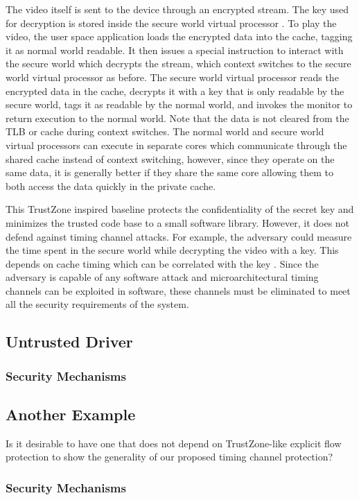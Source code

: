    The video itself is sent to the device through an encrypted stream. The key 
    used for decryption is stored inside the secure world virtual processor .  
    To play the video, the user space application loads the encrypted data into 
    the cache, tagging it as normal world readable. It then issues a special 
    instruction to interact with the secure world which decrypts the stream, 
    which context switches to the secure world virtual processor as before. The 
    secure world virtual processor
    reads the encrypted data in the cache, decrypts it with a key that is only 
    readable by the secure world, tags it as readable by the normal world, and 
    invokes the monitor to return execution to the normal world. Note that the 
    data is not cleared from the TLB or cache during context switches.  The 
    normal world and secure world virtual processors can execute in separate 
    cores which communicate through the shared cache instead of context 
    switching, however, since they operate on the same data, it is generally 
    better if they share the same core allowing them to both access the data 
    quickly in the private cache. 

    This TrustZone inspired baseline protects the confidentiality of the secret 
    key and minimizes the trusted code base to a small software library.  
    However, it does not defend against timing channel attacks.
    For example, the adversary could measure the time spent in the secure world 
    while decrypting the video with a key. This depends on cache timing which 
    can be correlated with the key \cite{bernstein,others}.
    Since the adversary is capable of any software attack and 
    microarchitectural timing channels can be exploited in software, these 
    channels must be eliminated to meet all the security requirements of the 
    system.

    \subsection{Untrusted Driver}
    \subsubsection{Security Mechanisms}
    \subsection{Another Example}
    Is it desirable to have one that does not depend on TrustZone-like explicit 
    flow protection to show the generality of our proposed timing channel 
    protection?
    \subsubsection{Security Mechanisms}
